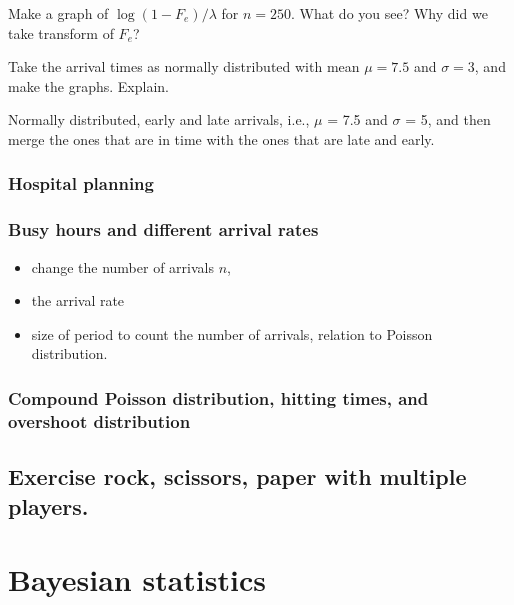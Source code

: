 \documentclass[a4paper]{article}
\begin{document}
\begin{exercise}
Make a graph of  $\log(1-F_e)/\lambda$  for $n=250$. What do you see? Why did we take transform of $F_e$?
\end{exercise}


\begin{exercise}
Take the arrival times as normally distributed with mean $\mu=7.5$ and $\sigma=3$, and make the graphs. Explain. 
\end{exercise}

Normally distributed, early and late arrivals, i.e., \(\mu\) = 7.5 and \(\sigma\) = 5, and then merge the ones that are in time with the ones that are late and early. 

\subsubsection{Hospital planning}
\label{sec:org797c22e}

\subsubsection{Busy hours and different arrival rates}
\label{sec:org67a19a4}


\begin{itemize}
\item change the number of arrivals \(n\),
\item the arrival rate
\item size of period to count the number of arrivals, relation to Poisson distribution.
\end{itemize}




\subsubsection{Compound Poisson distribution, hitting times, and overshoot distribution}
\label{sec:org0740c9c}


\subsection{Exercise rock, scissors, paper with multiple players.}
\label{sec:org351adb7}



\section{Bayesian statistics}
\label{sec:org1f4616c}
\end{document}
